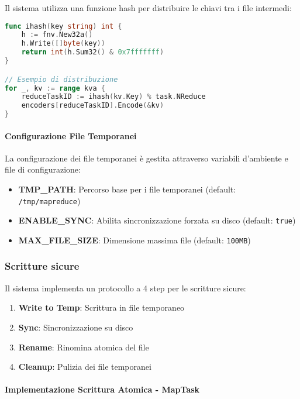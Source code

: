 \documentclass[12pt,a4paper]{article}
\begin{document}
Il sistema utilizza una funzione hash per distribuire le chiavi tra i file intermedi:

\begin{lstlisting}[language=Go, caption=Funzione hash per distribuzione chiavi]
func ihash(key string) int {
    h := fnv.New32a()
    h.Write([]byte(key))
    return int(h.Sum32() & 0x7fffffff)
}

// Esempio di distribuzione
for _, kv := range kva {
    reduceTaskID := ihash(kv.Key) % task.NReduce
    encoders[reduceTaskID].Encode(&kv)
}
\end{lstlisting}

\paragraph{Configurazione File Temporanei}

La configurazione dei file temporanei è gestita attraverso variabili d'ambiente e file di configurazione:

\begin{itemize}
\item \textbf{TMP\_PATH}: Percorso base per i file temporanei (default: \texttt{/tmp/mapreduce})
\item \textbf{ENABLE\_SYNC}: Abilita sincronizzazione forzata su disco (default: \texttt{true})
\item \textbf{MAX\_FILE\_SIZE}: Dimensione massima file (default: \texttt{100MB})
\end{itemize}

\subsubsection{Scritture sicure}

Il sistema implementa un protocollo a 4 step per le scritture sicure:

\begin{enumerate}
\item \textbf{Write to Temp}: Scrittura in file temporaneo
\item \textbf{Sync}: Sincronizzazione su disco
\item \textbf{Rename}: Rinomina atomica del file
\item \textbf{Cleanup}: Pulizia dei file temporanei
\end{enumerate}

\paragraph{Implementazione Scrittura Atomica - MapTask}
\end{document}
